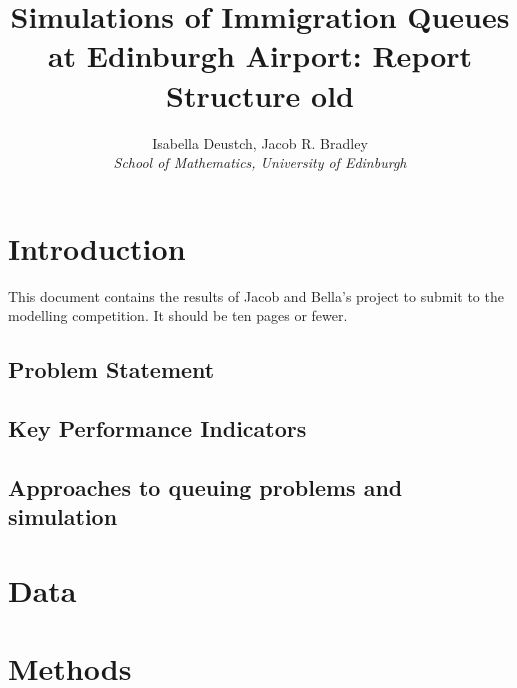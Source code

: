 \documentclass[12pt]{article}
\title{Simulations of Immigration Queues at Edinburgh Airport: Report Structure old}
\author{Isabella Deustch, Jacob R. Bradley
 \\ \emph{School of Mathematics, University of Edinburgh}}
\begin{document}
\maketitle

\section{Introduction}
This document contains the results of Jacob and Bella's project to submit to the modelling competition. It should be ten pages or fewer.




\subsection{Problem Statement}
\subsection{Key Performance Indicators}
\subsection{Approaches to queuing problems and simulation}


\section{Data}




\section{Methods}

\end{document}
